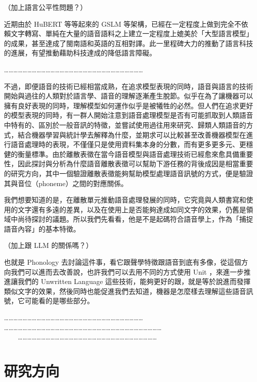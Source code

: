     （加上語言公平性問題？）

    近期由於 HuBERT 等等起來的 GSLM 等架構，已經在一定程度上做到完全不依賴文字轉寫、單純在大量的語音語料之上建立一定程度上媲美於「大型語言模型」的成果，甚至達成了閩南語和英語的互相對譯。此一里程碑大力的推動了語言科技的進展，有望推動藉助科技達成的降低語言障礙。

    ………………………………………………………………………………

    
    
   不過，即便語音的技術已經相當成熟，在追求模型表現的同時，語音與語言的技術開始與過往的人類對於語言學、語音的理解逐漸產生脫節。似乎在為了讓機器可以擁有良好表現的同時，理解模型如何運作似乎是被犧牲的必然。但人們在追求更好的模型表現的同時，有一群人開始注意到語音處理模型是否有可能抓取到人類語音中特有的、區別於一般音訊的特徵，並嘗試使用過往用來研究、歸類人類語音的方式，結合機器學習與統計學去解釋為什麼，並期求可以比較甚至改善機器模型在進行語音處理時的表現，不僅僅只是使用資料集本身的分數，而有更多更多元、更穩健的衡量標準。由於離散表徵在當今語音模型與語音處理技術已經愈來愈具備重要性，因此探討與分析為什麼語音離散表徵可以幫助下游任務的背後成因是相當重要的研究方向，其中一個驗證離散表徵能夠幫助模型處理語音訊號的方式，便是驗證其與音位（phoneme）之間的對應關係。

    我們想要知道的是，在離散單元推動語音處理發展的同時，它究竟與人類書寫和使用的文字還有多遠的差異，以及在使用上是否能夠達成如同文字的效果，仍舊是領域中尚待探討的議題。所以我們先看看，他是不是起碼符合語音學上，作為「捕捉語音內容」的基本特徵。

    （加上跟 LLM 的關係嗎？）

    也就是 Phonology 去討論這件事，看它跟聲學特徵跟語音到底有多像，從這個方向我們可以進而去改善說，也許我們可以去用不同的方式使用 Unit ，來進一步推進讓我們的 Unwritten Language 這些技術，能夠更好的跟，就是等於說進而發揮類似文字的效果，然後同時也能促進我們去知道，機器是怎麼樣去理解這些語音訊號，它可能看的是哪些部分。

    ……………………………………………………………………………… \\
    ………………………………………………………………………………………… \\
　　………………………………………………………………………………


\section{研究方向}


